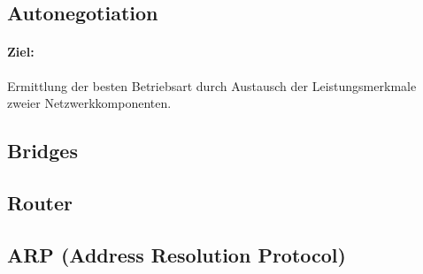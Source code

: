 \subsection{Autonegotiation}

{\paragraph{Ziel:}  Ermittlung der besten Betriebsart durch Austausch der
    Leistungsmerkmale zweier Netzwerkkomponenten.}

\subsection{Bridges}

\subsection{Router}

\subsection{ARP (Address Resolution Protocol)
}


